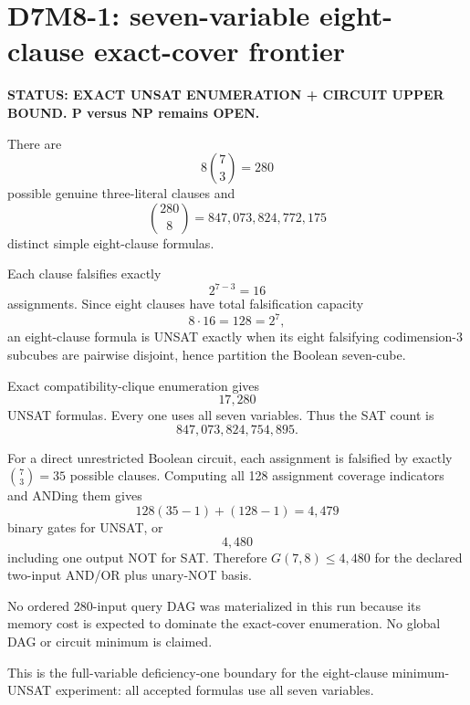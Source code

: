 \section*{D7M8-1: seven-variable eight-clause exact-cover frontier}

\textbf{STATUS: EXACT UNSAT ENUMERATION + CIRCUIT UPPER BOUND. P versus NP remains OPEN.}

There are
\[
8\binom73=280
\]
possible genuine three-literal clauses and
\[
\binom{280}{8}=847{,}073{,}824{,}772{,}175
\]
distinct simple eight-clause formulas.

Each clause falsifies exactly
\[
2^{7-3}=16
\]
assignments. Since eight clauses have total falsification capacity
\[
8\cdot16=128=2^7,
\]
an eight-clause formula is UNSAT exactly when its eight falsifying codimension-3
subcubes are pairwise disjoint, hence partition the Boolean seven-cube.

Exact compatibility-clique enumeration gives
\[
\boxed{17{,}280}
\]
UNSAT formulas. Every one uses all seven variables. Thus the SAT count is
\[
847{,}073{,}824{,}754{,}895.
\]

For a direct unrestricted Boolean circuit, each assignment is falsified by
exactly \(\binom73=35\) possible clauses. Computing all 128 assignment
coverage indicators and ANDing them gives
\[
128(35-1)+(128-1)=4{,}479
\]
binary gates for UNSAT, or
\[
\boxed{4{,}480}
\]
including one output NOT for SAT. Therefore \(G(7,8)\le4{,}480\) for the
declared two-input AND/OR plus unary-NOT basis.

No ordered 280-input query DAG was materialized in this run because its memory
cost is expected to dominate the exact-cover enumeration. No global DAG or
circuit minimum is claimed.

This is the full-variable deficiency-one boundary for the eight-clause
minimum-UNSAT experiment: all accepted formulas use all seven variables.

